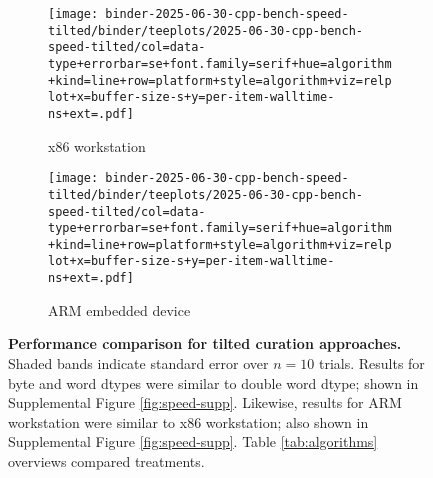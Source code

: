\begin{figure}


\begin{subfigure}{\linewidth}
\texttt{[image: binder-2025-06-30-cpp-bench-speed-tilted/binder/teeplots/2025-06-30-cpp-bench-speed-tilted/col=data-type+errorbar=se+font.family=serif+hue=algorithm+kind=line+row=platform+style=algorithm+viz=relplot+x=buffer-size-s+y=per-item-walltime-ns+ext=.pdf]}
\caption{\small x86 workstation}
\label{fig:speed:thinkpad}
\end{subfigure}

\begin{subfigure}{\linewidth}
\texttt{[image: binder-2025-06-30-cpp-bench-speed-tilted/binder/teeplots/2025-06-30-cpp-bench-speed-tilted/col=data-type+errorbar=se+font.family=serif+hue=algorithm+kind=line+row=platform+style=algorithm+viz=relplot+x=buffer-size-s+y=per-item-walltime-ns+ext=.pdf]}
\caption{\small ARM embedded device}
\label{fig:speed:pi}
\end{subfigure}

\caption{%
\textbf{Performance comparison for tilted curation approaches.}
\small
Shaded bands indicate standard error over $n=10$ trials.
Results for byte and word dtypes were similar to double word dtype; shown in Supplemental Figure \ref{fig:speed-supp}.
Likewise, results for ARM workstation were similar to x86 workstation; also shown in Supplemental Figure \ref{fig:speed-supp}.
Table \ref{tab:algorithms} overviews compared treatments.
}
\label{fig:speed}
\end{figure}
